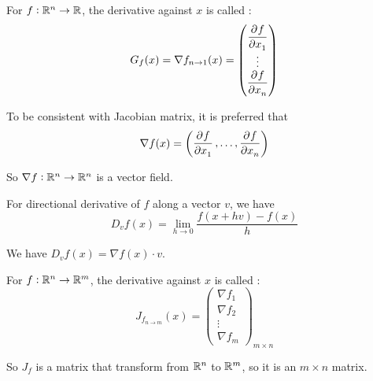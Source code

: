 \begin{definition}[Gradient]
    For $f: \mathbb{R}^n \rightarrow \mathbb{R}$, the derivative against $x$ is called :
    \begin{equation}
    G_f (x) = \nabla f_{n \rightarrow 1} (x) = \begin{pmatrix}
        \dpd{f}{x_1} \\
        \vdots \\
        \dpd{f}{x_n}
    \end{pmatrix}
    \end{equation}
    
    To be consistent with Jacobian matrix, it is preferred that
    \begin{equation}
        \nabla f (x) = \begin{pmatrix}
            \dpd{f}{x_1}, \hdots, \dpd{f}{x_n}
        \end{pmatrix}
    \end{equation}
    
    So $\nabla f: \mathbb{R}^n \rightarrow \mathbb{R}^n$ is a vector field.
\end{definition}




\begin{example}    
For directional derivative of $f$ along a vector $v$, we have 
\begin{equation}
    D_v f(x) = \lim\limits_{h \rightarrow 0} \frac{f(x + hv) - f(x)}{h}
\end{equation}

We have $D_v f(x) = \nabla f(x) \cdot v$.
\end{example}

\begin{definition}
    For $f: \mathbb{R}^n \rightarrow \mathbb{R}^m$, the derivative against $x$ is called :
    \begin{equation}
        J_{f_{n \rightarrow m}} (x) = \begin{pmatrix}
            \nabla f_1 \\
            \nabla f_2 \\
            \vdots \\
            \nabla f_m
        \end{pmatrix}_{m \times n}
    \end{equation}
    
    So $J_f$ is a matrix that transform from $\mathbb{R}^n$ to $\mathbb{R}^m$, so it is an $m \times n$ matrix.
\end{definition}


